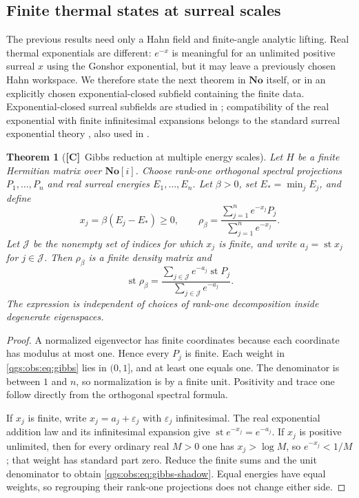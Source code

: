\documentclass[11pt,oneside]{article}
\numberwithin{equation}{section}
\theoremstyle{plain}
\newtheorem{theorem}{Theorem}[section]
\theoremstyle{definition}
\theoremstyle{remark}
\newcommand{\No}{\mathbf{No}}
\DeclareMathOperator{\st}{st}
\newcommand{\TC}{\textcolor{TierC}{\textsf{\bfseries[C]}}}
\begin{document}
\subsection{Finite thermal states at surreal scales}\label{qgs:obs:sec:gibbs}
The previous results need only a Hahn field and finite-angle analytic lifting. Real thermal exponentials are different: $e^{-x}$ is meaningful for an unlimited positive surreal $x$ using the Gonshor exponential, but it may leave a previously chosen Hahn workspace. We therefore state the next theorem in $\No$ itself, or in an explicitly chosen exponential-closed subfield containing the finite data. Exponential-closed surreal subfields are studied in \cite{BournezGuilmant}; compatibility of the real exponential with finite infinitesimal expansions belongs to the standard surreal exponential theory \cite{Gonshor}, also used in \cite{BM}.

\begin{theorem}[\TC\ Gibbs reduction at multiple energy scales]\label{qgs:obs:thm:gibbs}
Let $H$ be a finite Hermitian matrix over $\No[i]$. Choose rank-one orthogonal spectral projections $P_1,\ldots,P_n$ and real surreal energies $E_1,\ldots,E_n$. Let $\beta>0$, set $E_*=\min_jE_j$, and define
\begin{equation}\label{qgs:obs:eq:gibbs}
 x_j=\beta(E_j-E_*)\ge0,\qquad
 \rho_\beta=\frac{\sum_{j=1}^n e^{-x_j}P_j}
                  {\sum_{j=1}^n e^{-x_j}}.
\end{equation}
Let $\mathcal J$ be the nonempty set of indices for which $x_j$ is finite, and write $a_j=\st x_j$ for $j\in\mathcal J$. Then $\rho_\beta$ is a finite density matrix and
\begin{equation}\label{qgs:obs:eq:gibbs-shadow}
 \st\rho_\beta=
 \frac{\sum_{j\in\mathcal J}e^{-a_j}\st P_j}
      {\sum_{j\in\mathcal J}e^{-a_j}}.
\end{equation}
The expression is independent of choices of rank-one decomposition inside degenerate eigenspaces.
\end{theorem}
\begin{proof}
A normalized eigenvector has finite coordinates because each coordinate has modulus at most one. Hence every $P_j$ is finite. Each weight in \eqref{qgs:obs:eq:gibbs} lies in $(0,1]$, and at least one equals one. The denominator is between $1$ and $n$, so normalization is by a finite unit. Positivity and trace one follow directly from the orthogonal spectral formula.

If $x_j$ is finite, write $x_j=a_j+\varepsilon_j$ with $\varepsilon_j$ infinitesimal. The real exponential addition law and its infinitesimal expansion give $\st e^{-x_j}=e^{-a_j}$. If $x_j$ is positive unlimited, then for every ordinary real $M>0$ one has $x_j>\log M$, so $e^{-x_j}<1/M$; that weight has standard part zero. Reduce the finite sums and the unit denominator to obtain \eqref{qgs:obs:eq:gibbs-shadow}. Equal energies have equal weights, so regrouping their rank-one projections does not change either side.
\end{proof}
\end{document}
